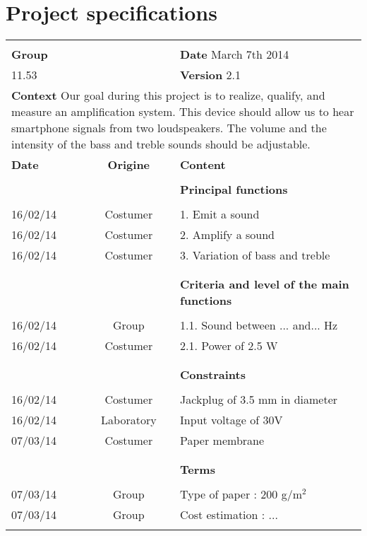 

\chapter{Project specifications}

\begin{table*}[ht!]
\begin{tabular}{|l|c|l|}

\hline
&&\\
\textbf{Group} & & \hfill \textbf{Date}  March 7th 2014\\
11.53 && \hfill \textbf{Version} 2.1\\

\hline
\multicolumn{3}{|p{15cm}|}{\textbf{Context} \newline
Our goal during this project is to realize, qualify, and measure an amplification system. This device should allow us to hear smartphone signals from two loudspeakers. The volume and the intensity of the bass and treble sounds should be adjustable.}  \\


\hline
\textbf{Date} & \textbf{Origine} & \textbf{Content}\\
\hline
&&\\
&&\textbf{Principal functions}\\
&&\\
16/02/14 & Costumer & 1. Emit a sound \\
16/02/14 & Costumer & 2. Amplify a sound \\
16/02/14 & Costumer & 3. Variation of bass and treble \\
&&\\
\hline
&&\\
& & \textbf{Criteria and level of the main functions} \\
&&\\
16/02/14 & Group & 1.1. Sound between ... and... Hz \\
16/02/14 & Costumer & 2.1. Power of 2.5 W \\
&&\\
\hline
&&\\
& & \textbf{Constraints} \\
&&\\
16/02/14 & Costumer &   Jackplug of 3.5 mm in diameter\\
16/02/14 & Laboratory &  Input voltage of 30V \\
07/03/14 & Costumer&  Paper membrane \\
&&\\
\hline
&&\\
& & \textbf{Terms} \\
&&\\
07/03/14 & Group & Type of paper : 200 g/m$^{2}$ \\
07/03/14 & Group & Cost estimation : ...\\

&&\\
\hline
\end{tabular}

\end{table*}

